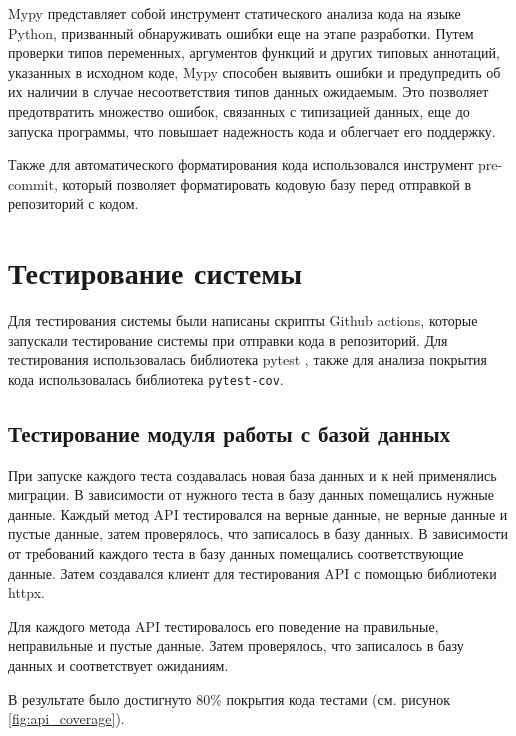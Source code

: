 \documentclass[PI, VKR]{HSEUniversity}
\begin{document}
Mypy представляет собой инструмент статического анализа кода на языке Python, призванный обнаруживать ошибки еще на этапе разработки. Путем проверки типов переменных, аргументов функций и других типовых аннотаций, указанных в исходном коде, Mypy способен выявить ошибки и предупредить об их наличии в случае несоответствия типов данных ожидаемым. Это позволяет предотвратить множество ошибок, связанных с типизацией данных, еще до запуска программы, что повышает надежность кода и облегчает его поддержку.

Также для автоматического форматирования кода использовался инструмент pre-commit, который позволяет форматировать кодовую базу перед отправкой в репозиторий с кодом.
\section{Тестирование системы}
\label{sec:org438c918}
Для тестирования системы были написаны скрипты Github actions, которые запускали тестирование системы при отправки кода в репозиторий. Для тестирования использовалась библиотека pytest \autocite{krekel_pytest_2004}, также для анализа покрытия кода использовалась библиотека \texttt{pytest-cov}.
\subsection{Тестирование модуля работы с базой данных}
\label{sec:orgdb2f055}
При запуске каждого теста создавалась новая база данных и к ней применялись миграции. В зависимости от нужного теста в базу данных помещались нужные данные. Каждый метод API тестировался на верные данные, не верные данные и пустые данные, затем проверялось, что записалось в базу данных. В зависимости от требований каждого теста в базу данных помещались соответствующие данные. Затем создавался клиент для тестирования API с помощью библиотеки httpx.

Для каждого метода API тестировалось его поведение на правильные, неправильные и пустые данные. Затем проверялось, что записалось в базу данных и соответствует ожиданиям.

В результате было достигнуто 80\% покрытия кода тестами (см. рисунок \ref{fig:api_coverage}).
\end{document}
